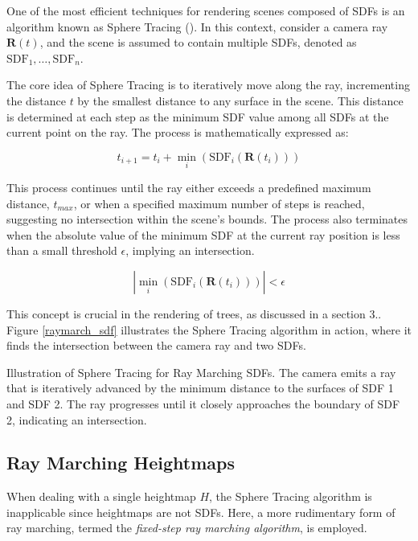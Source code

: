 One of the most efficient techniques for rendering scenes composed of SDFs is an algorithm known as Sphere Tracing (). In this context, consider a camera ray $\mathbf{R}(t)$, and the scene is assumed to contain multiple SDFs, denoted as $\text{SDF}_1, \dots, \text{SDF}_n$.

The core idea of Sphere Tracing is to iteratively move along the ray, incrementing the distance $t$ by the smallest distance to any surface in the scene. This distance is determined at each step as the minimum SDF value among all SDFs at the current point on the ray. The process is mathematically expressed as:

\begin{equation}
    t_{i+1} = t_{i} + \min_i(\text{SDF}_i(\mathbf{R}(t_i)))
\end{equation}

This process continues until the ray either exceeds a predefined maximum distance, $t_{max}$, or when a specified maximum number of steps is reached, suggesting no intersection within the scene's bounds. The process also terminates when the absolute value of the minimum SDF at the current ray position is less than a small threshold $\epsilon$, implying an intersection.

\begin{equation}
|\min_{i}(\text{SDF}_i(\mathbf{R}(t_i)))| < \epsilon 
\end{equation}

This concept is crucial in the rendering of trees, as discussed in a section 3.\todo{}. Figure \ref{raymarch_sdf} illustrates the Sphere Tracing algorithm in action, where it finds the intersection between the camera ray and two SDFs. 

{Illustration of Sphere Tracing for Ray Marching SDFs. The camera emits a ray that is iteratively advanced by the minimum distance to the surfaces of SDF 1 and SDF 2. The ray progresses until it closely approaches the boundary of SDF 2, indicating an intersection.}

\subsection{Ray Marching Heightmaps}
\label{Raymarching Heightmaps}

When dealing with a single heightmap $H$, the Sphere Tracing algorithm is inapplicable since heightmaps are not SDFs. Here, a more rudimentary form of ray marching, termed the \textit{fixed-step ray marching algorithm}, is employed.


